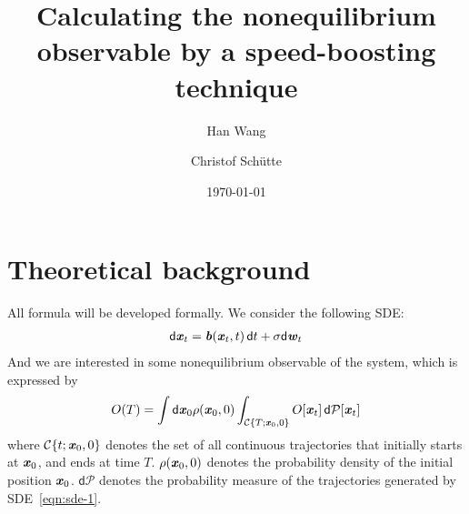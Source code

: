 \documentclass[aip,jcp,a4paper,reprint,onecolumn]{revtex4-1}
\newcommand{\vect}[1]{\textbf{\textit{#1}}}
\newcommand{\dd}{\textsf{d}}
\newcommand{\mc}{\mathcal C}
\newcommand{\pathmeas}{\mathcal P}
\begin{document}
\title{Calculating the nonequilibrium observable by a speed-boosting
technique}
\author{Han Wang}
\author{Christof Sch\"utte}

\date{\today}

\begin{abstract}
\end{abstract}

\maketitle



\section{Theoretical background}

All formula will be developed formally. We consider the following SDE:
\begin{align}\label{eqn:sde-1}
  \dd \vect x_t = \vect b(\vect x_t, t)\, \dd t + \sigma\dd \vect w_t
\end{align}
And we are interested in some nonequilibrium observable of the system,
which is expressed by
\begin{align*}
  O(T) = \int \dd\vect x_0 \rho(\vect x_0, 0)
  \int_{\mc\{T; \vect x_0, 0\}} 
  O[\vect x_t]\,\dd\pathmeas[\vect x_t]
\end{align*}
where $\mc\{t; \vect x_0, 0\}$ denotes the set of all continuous
trajectories that initially starts at $\vect x_0$, and ends at time $T$.
$\rho(\vect x_0, 0)$ denotes the probability density of the initial position
$\vect x_0$. $\dd \pathmeas$ denotes the probability measure of the trajectories
generated by SDE~\eqref{eqn:sde-1}.
\end{document}
